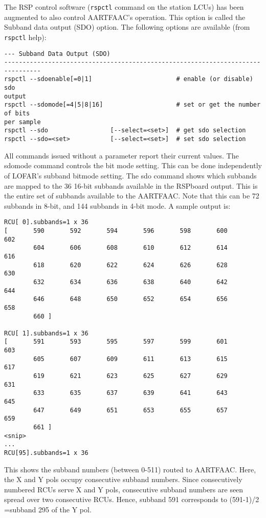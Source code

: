 \documentclass {article}
\begin{document}
The RSP control software (\verb+rspctl+ command  on the station LCUs) has been
augmented  to also  control AARTFAAC's  operation. This  option is  called the
Subband data output  (SDO) option.  The following options  are available (from
\verb+rspctl+ help):
\begin{verbatim}
--- Subband Data Output (SDO)
--------------------------------------------------------------------------------
rspctl --sdoenable[=0|1]                       # enable (or disable) sdo
output
rspctl --sdomode[=4|5|8|16]                    # set or get the number of bits
per sample
rspctl --sdo                 [--select=<set>]  # get sdo selection
rspctl --sdo=<set>           [--select=<set>]  # set sdo selection
\end{verbatim}

All  commands issued  without a  parameter report  their current  values.  The
sdomode command controls the bit mode  setting. This can be done independently
of LOFAR's  subband bitmode  setting. The  sdo command  shows which
subbands  are mapped  to  the 36  16-bit subbands  available  in the  RSPboard
output. This  is the entire  set of subbands  available to the  AARTFAAC. Note
that this  can be 72  subbands in  8-bit, and 144  subbands in 4-bit  mode.  A
sample output is:
\begin{verbatim}
RCU[ 0].subbands=1 x 36
[       590       592       594       596       598       600       602 
        604       606       608       610       612       614       616 
        618       620       622       624       626       628       630 
        632       634       636       638       640       642       644 
        646       648       650       652       654       656       658 
        660 ]

RCU[ 1].subbands=1 x 36
[       591       593       595       597       599       601       603 
        605       607       609       611       613       615       617 
        619       621       623       625       627       629       631 
        633       635       637       639       641       643       645 
        647       649       651       653       655       657       659 
        661 ]
<snip>
...
RCU[95].subbands=1 x 36
\end{verbatim}
This shows the subband numbers (between 0-511) routed to AARTFAAC. Here, the X and Y
pols  occupy consecutive  subband numbers.  Since consecutively  numbered RCUs
serve  X and  Y pols,  consecutive subband  numbers are  seen spread  over two
consecutive RCUs. Hence, subband 591 corresponds to (591-1)/2 =subband 295 of
the Y pol.\\
\end{document}
